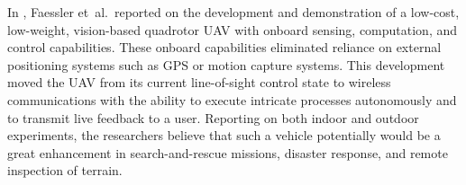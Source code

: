 In \cite{Faessler2016}, Faessler et~al.\ reported on the development and demonstration of a low-cost, low-weight, vision-based quadrotor UAV with onboard sensing, computation, and control capabilities. These onboard capabilities eliminated reliance on external positioning systems such as GPS or motion capture systems. This development moved the UAV from its current line-of-sight control state to wireless communications with the ability to execute intricate processes autonomously and to transmit live feedback to a user. Reporting on both indoor and outdoor experiments, the researchers believe that such a vehicle potentially would be a great enhancement in search-and-rescue missions, disaster response, and remote inspection of terrain. 
